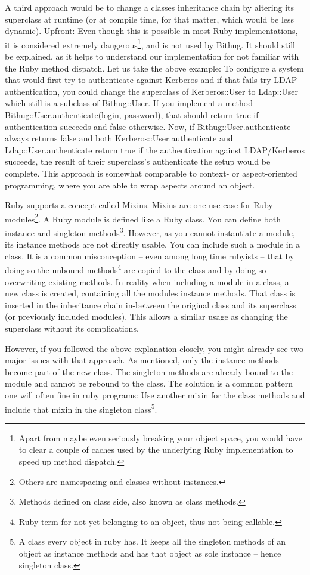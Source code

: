 \documentclass{llncs}
\begin{document}
A third approach would be to change a classes inheritance chain by altering its superclass at runtime (or at compile
time, for that matter, which would be less dynamic). Upfront: Even though this is possible in most Ruby implementations,
it is considered extremely dangerous\footnote{Apart from maybe even seriously breaking your object space, you would have
to clear a couple of caches used by the underlying Ruby implementation to speed up method dispatch.}, and is not used
by Bithug. It should still be explained, as it helps to understand our implementation for not familiar with the Ruby
method dispatch. Let us take the above example: To configure a system that would first try to authenticate against Kerberos
and if that fails try LDAP authentication, you could change the superclass of Kerberos::User to Ldap::User which still
is a subclass of Bithug::User. If you implement a method Bithug::User.authenticate(login, password), that should return
true if authentication succeeds and false otherwise. Now, if Bithug::User.authenticate always returns false and both
Kerberos::User.authenticate and Ldap::User.authenticate return true if the authentication against LDAP/Kerberos succeeds,
the result of their superclass's authenticate the setup would be complete. This approach is somewhat comparable to context-
or aspect-oriented programming, where you are able to wrap aspects around an object\cite{apel2006aspectual}.

Ruby supports a concept called Mixins\cite{apel2004using}. Mixins are one use case for Ruby modules\footnote{Others are namespacing
and classes without instances.}. A Ruby module is defined like a Ruby class. You can define both instance and singleton
methods\footnote{Methods defined on class side, also known as class methods.}. However, as you cannot instantiate a module,
its instance methods are not directly usable. You can include such a module in a class. It is a common misconception – even among
long time rubyists – that by doing so the unbound methods\footnote{Ruby term for not yet belonging to an object, thus not being
callable.} are copied to the class and by doing so overwriting existing methods. In reality when including a module in a class,
a new class is created, containing all the modules instance methods. That class is inserted in the inheritance chain in-between
the original class and its superclass (or previously included modules). This allows a similar usage as changing the superclass
without its complications.

However, if you followed the above explanation closely, you might already see two major issues with that approach. As mentioned,
only the instance methods become part of the new class. The singleton methods are already bound to the module and cannot be
rebound to the class. The solution is a common pattern one will often fine in ruby programs: Use another mixin for the class methods
and include that mixin in the singleton class\footnote{A class every object in ruby has. It keeps all the singleton methods of an
object as instance methods and has that object as sole instance – hence singleton class.}.
\end{document}
